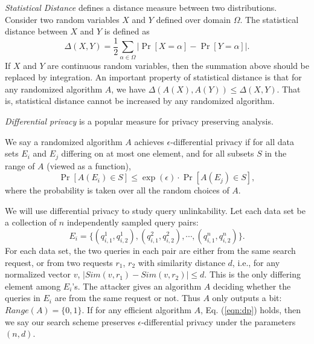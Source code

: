 \documentclass{IEEEtran}
\begin{document}
\emph{Statistical Distance} \cite{AB09,G95} defines a distance measure between two distributions. Consider two random variables $X$ and $Y$ defined over domain $\Omega$. The statistical distance between $X$ and $Y$ is defined as
$$\Delta(X,Y) = \frac{1}{2}\sum_{\alpha\in\Omega} |\Pr[X=\alpha] - \Pr[Y=\alpha]|.$$
If $X$ and $Y$ are continuous random variables, then the summation above should be replaced by integration.
An important property of statistical distance is that for any randomized algorithm $A$, we have $\Delta(A(X),A(Y))\leq\Delta(X,Y)$. That is, statistical distance cannot be increased by any randomized algorithm.

\emph{Differential privacy} \cite{Dwork08,DR14} is a popular measure for privacy preserving analysis. 
\begin{definition}
We say a randomized algorithm $A$ achieves $\epsilon$-differential privacy if for all data sets $E_i$ and $E_j$ differing on at most one element, and for all subsets $S$ in the range of $A$ (viewed as a function),
\begin{equation}
\label{eqn:dp}
\Pr[A(E_i) \in S] \leq \exp(\epsilon)\cdot \Pr[A(E_j)\in S],
\end{equation}
where the probability is taken over all the random choices of $A$.
\end{definition}
We will use differential privacy to study query unlinkability. Let each data set be a collection of $n$ independently sampled query pairs: 
$$E_i = \{(q_{i,1}^1, q_{i,2}^1), (q_{i,1}^2, q_{i,2}^2), \cdots, (q_{i,1}^n, q_{i,2}^n)\}.$$
For each data set, the two queries in each pair are either from the same search request, or from two requests $r_1$, $r_2$ with similarity distance $d$, i.e., for any normalized vector $v$, $|Sim(v,r_1) - Sim(v,r_2)| \leq d$. This is the only differing element among $E_i$'s. The attacker gives an algorithm $A$ deciding whether the queries in $E_i$ are from the same request or not. Thus $A$ only outputs a bit: $Range(A) = \{0,1\}$. If for any efficient algorithm $A$, Eq. (\ref{eqn:dp}) holds, then we say our search scheme preserves $\epsilon$-differential privacy under the parameters $(n, d)$.
\end{document}
